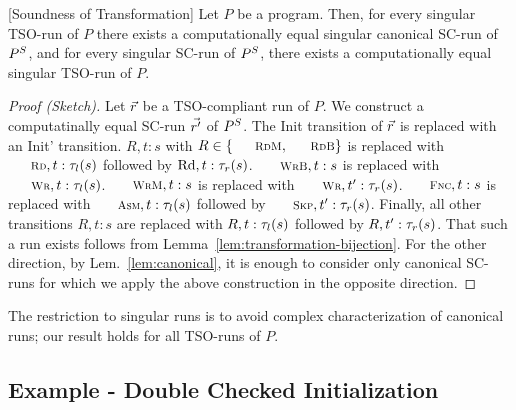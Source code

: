 \begin{theorem}\label{thm:soundness}[Soundness of Transformation]
Let $P$ be a program.
Then, for every singular TSO-run of $P$ there exists a computationally equal singular canonical SC-run of $P^S$,
and for every singular SC-run of $P^S$, there exists a computationally equal singular TSO-run of $P$. 
\end{theorem}
\begin{proof}[Proof (Sketch)]
Let $\vec{r}$ be a TSO-compliant run of $P$.
We construct a computatinally equal SC-run $\vec{r'}$ of $P^S$.
The {\sc\small Init} transition of $\vec{r}$ is replaced with an {\sc\small Init'} transition.
$R,t:s$ with $R\in \{\textnormal{\sc\small RdM},\textnormal{\sc\small RdB}\}$ is replaced with $\textnormal{\sc\small Rd},t:\aliloctransx s$ followed by $\textnormal{Rd},t:\tau_{r}(s)$.
$\textnormal{\sc\small WrB},t:s$ is replaced with $\textnormal{\sc\small Wr},t:\aliloctransx s$.
$\textnormal{\sc\small WrM},t:s$ is replaced with $\textnormal{\sc\small Wr},t':\aliremtransx s$.
$\textnormal{\sc\small Fnc},t:s$ is replaced with $\textnormal{\sc\small Asm},t:\aliloctransx s$ followed by $\textnormal{\sc\small Skp},t':\aliremtransx s$.
Finally, all other transitions $R,t:s$ are replaced with $R,t:\tau_{l}(s)$ followed by $R,t':\tau_{r}(s)$.
That such a run exists follows from Lemma~\ref{lem:transformation-bijection}.
For the other direction, by Lem.~\ref{lem:canonical}, it is enough to consider only canonical SC-runs  for which we apply the above construction in the opposite direction.
\end{proof}
The restriction to singular runs is to avoid complex characterization of canonical runs; our result holds for all TSO-runs of $P$.





\subsection{Example - Double Checked Initialization}
\label{subsec:example-double-check}

